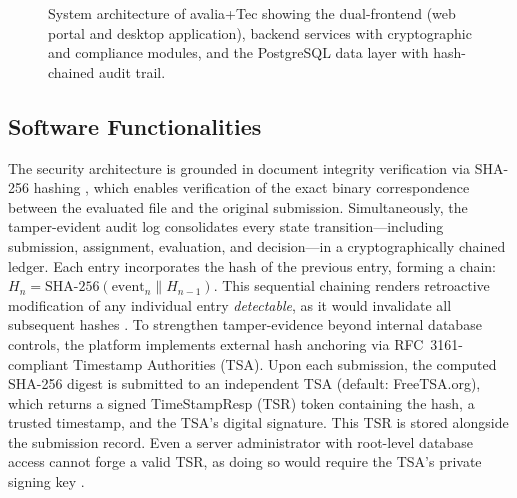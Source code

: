 \documentclass[preprint,12pt,a4paper]{elsarticle}
\providecommand{\DIFaddendFL}{} %
\DeclareRobustCommand{\DIFaddendFL}{\DIFOaddendFL \let\includegraphics\DIFOincludegraphics} %
\begin{document}
\begin{figure}[H]
{%
}\DIFaddendFL %
\caption{System architecture of avalia+Tec showing the dual-frontend (web portal and desktop application), backend services with cryptographic and compliance modules, and the PostgreSQL data layer with hash-chained audit trail.}
\label{fig:architecture}
\end{figure}

\subsection{Software Functionalities}

The security architecture is grounded in document integrity verification via SHA-256 hashing \citep{NIST2012}, which enables verification of the exact binary correspondence between the evaluated file and the original submission. Simultaneously, the tamper-evident audit log consolidates every state transition---including submission, assignment, evaluation, and decision---in a cryptographically chained ledger. Each entry incorporates the hash of the previous entry, forming a chain: $H_n = \text{SHA-256}(\text{event}_n \| H_{n-1})$. This sequential chaining renders retroactive modification of any individual entry \emph{detectable}, as it would invalidate all subsequent hashes \citep{Bellare1997}. To strengthen tamper-evidence beyond internal database controls, the platform implements external hash anchoring via RFC~3161-compliant Timestamp Authorities (TSA). Upon each submission, the computed SHA-256 digest is submitted to an independent TSA (default: FreeTSA.org), which returns a signed TimeStampResp (TSR) token containing the hash, a trusted timestamp, and the TSA's digital signature. This TSR is stored alongside the submission record. Even a server administrator with root-level database access cannot forge a valid TSR, as doing so would require the TSA's private signing key \citep{RFC3161}.
\end{document}
